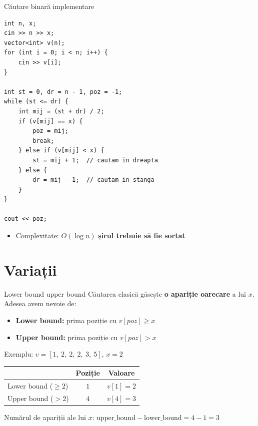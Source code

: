 \documentclass{beamer}
\begin{document}
\begin{frame}{Căutare binară \textemdash{} implementare}
  \begin{lstlisting}
int n, x;
cin >> n >> x;
vector<int> v(n);
for (int i = 0; i < n; i++) {
    cin >> v[i];
}

int st = 0, dr = n - 1, poz = -1;
while (st <= dr) {
    int mij = (st + dr) / 2;
    if (v[mij] == x) {
        poz = mij;
        break;
    } else if (v[mij] < x) {
        st = mij + 1;  // cautam in dreapta
    } else {
        dr = mij - 1;  // cautam in stanga
    }
}

cout << poz;
  \end{lstlisting}
  \begin{itemize}
    \item Complexitate: $O(\log n)$ \textemdash{} \textbf{șirul trebuie să fie sortat}
  \end{itemize}
\end{frame}

\section{Variații}

\begin{frame}{Lower bound \textemdash{} upper bound}
  Căutarea clasică găsește \textbf{o apariție oarecare} a lui $x$. Adesea avem nevoie de:

  \smallskip
  \begin{itemize}
    \item \textbf{Lower bound:} prima poziție cu $v[poz] \geq x$
    \item \textbf{Upper bound:} prima poziție cu $v[poz] > x$
  \end{itemize}

  Exemplu: $v = [1,\ 2,\ 2,\ 2,\ 3,\ 5]$, $x = 2$

  \smallskip
  \begin{center}
  \begin{tabular}{lcc}
    \toprule
    & Poziție & Valoare \\
    \midrule
    Lower bound ($\geq 2$) & $1$ & $v[1] = 2$ \\
    Upper bound ($> 2$)    & $4$ & $v[4] = 3$ \\
    \bottomrule
  \end{tabular}
  \end{center}

  \smallskip
  Numărul de apariții ale lui $x$: $\text{upper\_bound} - \text{lower\_bound} = 4 - 1 = 3$
\end{frame}
\end{document}
